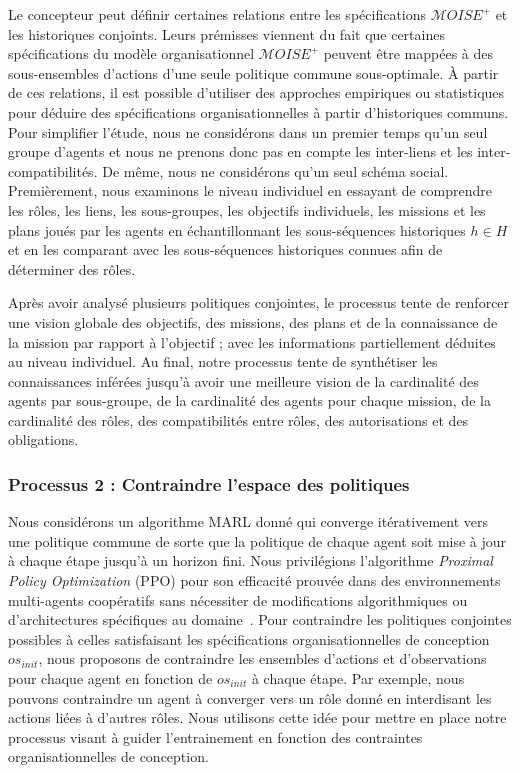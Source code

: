 Le concepteur peut définir certaines relations entre les spécifications $\mathcal{M}OISE^+$ et les historiques conjoints. Leurs prémisses viennent du fait que certaines spécifications du modèle organisationnel $\mathcal{M}OISE^+$ peuvent être mappées à des sous-ensembles d'actions d'une seule politique commune sous-optimale.
À partir de ces relations, il est possible d'utiliser des approches empiriques ou statistiques pour déduire des spécifications organisationnelles à partir d'historiques communs.
Pour simplifier l'étude, nous ne considérons dans un premier temps qu'un seul groupe d'agents et nous ne prenons donc pas en compte les inter-liens et les inter-compatibilités. De même, nous ne considérons qu'un seul schéma social.
Premièrement, nous examinons le niveau individuel en essayant de comprendre les rôles, les liens, les sous-groupes, les objectifs individuels, les missions et les plans joués par les agents en échantillonnant les sous-séquences historiques $h \in H$ et en les comparant avec les sous-séquences historiques connues afin de déterminer des rôles.

Après avoir analysé plusieurs politiques conjointes, le processus tente de renforcer une vision globale des objectifs, des missions, des plans et de la connaissance de la mission par rapport à l'objectif ; avec les informations partiellement déduites au niveau individuel.
Au final, notre processus tente de synthétiser les connaissances inférées jusqu'à avoir une meilleure vision de la cardinalité des agents par sous-groupe, de la cardinalité des agents pour chaque mission, de la cardinalité des rôles, des compatibilités entre rôles, des autorisations et des obligations.

\subsubsection{Processus 2 : Contraindre l'espace des politiques}

Nous considérons un algorithme MARL donné qui converge itérativement vers une politique commune de sorte que la politique de chaque agent soit mise à jour à chaque étape jusqu'à un horizon fini.
Nous privilégions l'algorithme \emph{Proximal Policy Optimization} (PPO) pour son efficacité prouvée dans des environnements multi-agents coopératifs sans nécessiter de modifications algorithmiques ou d'architectures spécifiques au domaine~\cite{Yu2022}.
Pour contraindre les politiques conjointes possibles à celles satisfaisant les spécifications organisationnelles de conception $os_{init}$, nous proposons de contraindre les ensembles d'actions et d'observations pour chaque agent en fonction de $os_{init}$ à chaque étape. Par exemple, nous pouvons contraindre un agent à converger vers un rôle donné en interdisant les actions liées à d'autres rôles. Nous utilisons cette idée pour mettre en place notre processus visant à guider l'entrainement en fonction des contraintes organisationnelles de conception.

